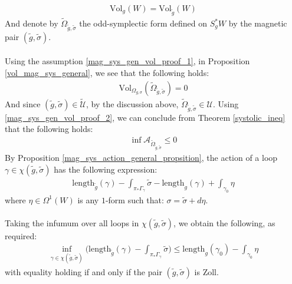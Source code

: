 \documentclass[11pt]{amsart}
\theoremstyle{plain}
\theoremstyle{definition}
\theoremstyle{remark}
\begin{document}
\begin{align}\label{mag_sys_gen_vol_proof_1}
    \text{Vol}_g(W) = \text{Vol}_{\tilde g}(W)
\end{align}
And denote by $\tilde \Omega_{\tilde g,\tilde \sigma}$ the odd-symplectic form defined on $S^*_gW$ by the magnetic pair $(\tilde g,\tilde \sigma)$.\\
\\
Using the assumption \eqref{mag_sys_gen_vol_proof_1}, in Proposition \ref{vol_mag_sys_general}, we see that the following holds:
\begin{align}\label{mag_sys_gen_vol_proof_2}
    \text{Vol}_{\Omega_{g,\sigma}}(\tilde \Omega_{\tilde g,\tilde \sigma})=0
\end{align}
And since $(\tilde g,\tilde \sigma) \in \tilde{\mathcal{U}}$, by the discussion above, $\tilde \Omega_{\tilde g,\tilde \sigma} \in \mathcal{U}$. Using \eqref{mag_sys_gen_vol_proof_2}, we can conclude from Theorem \ref{systolic_ineq} that the following holds:
\begin{align}
    \inf\mathcal{A}_{\tilde \Omega_{\tilde g,\tilde \sigma}} \leq 0
\end{align}
By Proposition \ref{mag_sys_action_general_propsition}, the action of a loop $\gamma \in \chi(\tilde g,\tilde \sigma)$ has the following expression:
\begin{align}
    \text{length}_{\tilde g}(\gamma) - \int_{\pi_*\Gamma_{ \gamma}} \tilde\sigma - \text{length}_{g}(\gamma) + \int_{\gamma_0}\eta
\end{align}
where $\eta \in \Omega^1(W)$ is any $1$-form such that: $\sigma= \tilde \sigma + d\eta$.\\
\\
Taking the infumum over all loops in $\chi(\tilde g,\tilde \sigma)$, we obtain the following, as required:
\begin{align}\label{mag_sys_general_proof_1}
\inf_{\gamma \in \chi(\tilde g,\tilde \sigma)}\Big(\text{length}_{\tilde g}(\gamma)-\int_{\pi_*\Gamma_{\gamma}} \tilde \sigma\Big) \leq \text{length}_{g}(\gamma_0) - \int_{\gamma_0}\eta
\end{align}
with equality holding if and only if the pair $(\tilde g,\tilde \sigma)$ is Zoll.
\end{document}

